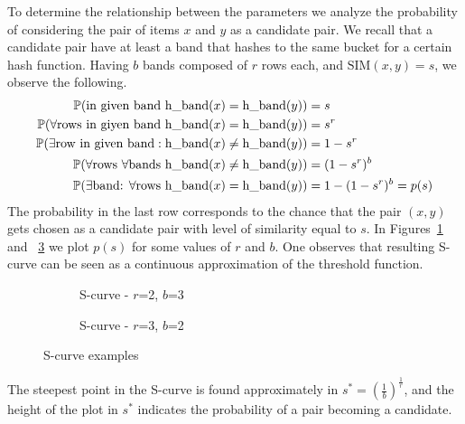 To determine the relationship between the parameters we analyze the probability of considering the pair of items $x$ and $y$ as a candidate pair. We recall that a candidate pair have at least a band that hashes to the same bucket for a certain hash function. Having $b$ bands composed of $r$ rows each, and $\text{SIM}(x,y)=s$, we observe the following.
\begin{align}
    \mathbb{P}(\text{in given band h\_band}(x)=\text{h\_band}(y))&= s \label{band_similarity}\\
    \mathbb{P}(\forall \text{rows in giyen band }\text{h\_band}(x)=\text{h\_band}(y))&= s^r \notag\\
    \mathbb{P}(\exists \text{row in given band}:\text{h\_band}(x)\neq\text{h\_band}(y))&= 1-s^r \notag\\
    \mathbb{P}(\forall \text{rows }\forall\text{bands }\text{h\_band}(x)\neq\text{h\_band}(y))&= (1-s^r)^b \notag\\
    \mathbb{P}(\exists \text{band: }\forall \text{rows }\text{h\_band}(x)=\text{h\_band}(y))&= 1-(1-s^r)^b=p(s) \notag
\end{align}
The probability in the last row corresponds to the chance that the pair $(x,y)$ gets chosen as a candidate pair with level of similarity equal to $s$.
In Figures~\ref{fig:s-curve1} and ~\ref{fig:s-curve2} we plot $p(s)$ for some values of $r$ and $b$. One observes that resulting S-curve can be seen as a continuous approximation of the threshold function.
\begin{figure}[ht]
    \centering
    \begin{subfigure}[b]{0.45\textwidth}
        \centering
        \caption{S-curve - $r$=2, $b$=3}
        \label{fig:s-curve1}
    \end{subfigure}
    \hspace{1cm}
    \begin{subfigure}[b]{0.45\textwidth}
        \centering
        \caption{S-curve - $r$=3, $b$=2}
        \label{fig:s-curve2}
    \end{subfigure}
    \caption{S-curve examples}
\end{figure}
The steepest point in the S-curve is found approximately in $s^*=(\frac{1}{b})^\frac{1}{r}$, and the height of the plot in $s^*$ indicates the probability of a pair becoming a candidate. 

